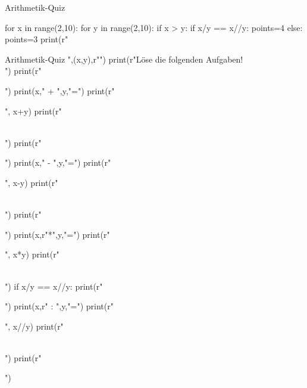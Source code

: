 \documentclass[ngerman,a4paper,10pt]{article}
\begin{document}
\begin{quiz}{Arithmetik-Quiz}
\begin{python}
for x in range(2,10):
  for y in range(2,10):
    if x > y:
      if x/y == x//y:
        points=4
      else:
        points=3  
      print(r"\begin{cloze}[points=", points ,r"]{Arithmetik-Quiz ",(x,y),r"}")
      print(r"L\"ose die folgenden Aufgaben!\\")
      print(r"\begin{numerical}")
      print(x," + ",y,"=")
      print(r"\item ", x+y) 
      print(r"\end{numerical}\\")
      print(r"\begin{numerical}")
      print(x," - ",y,"=")
      print(r"\item ", x-y) 
      print(r"\end{numerical}\\")
      print(r"\begin{numerical}")
      print(x,r"*",y,"=")
      print(r"\item ", x*y) 
      print(r"\end{numerical}\\")
      if x/y == x//y:
        print(r"\begin{numerical}")
        print(x,r" : ",y,"=")
        print(r"\item ", x//y) 
        print(r"\end{numerical}\\")
      print(r"\end{cloze} ")
\end{python}	
\end{quiz}
\end{document}
